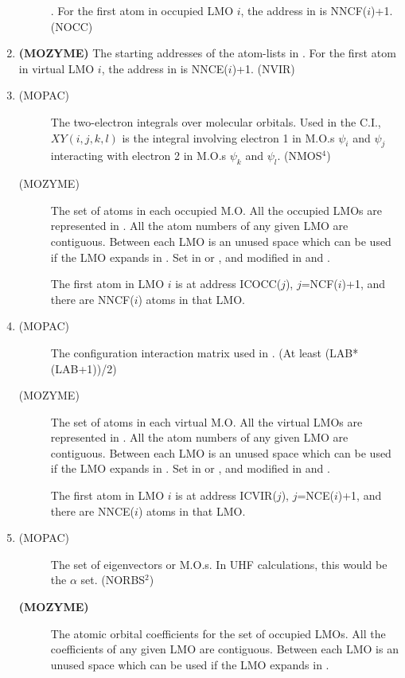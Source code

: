\begin{enumerate}
\begin{description}
.  For the first atom in occupied LMO $i$, the  address in
 is NNCF($i$)+1. (NOCC)
\end{description}
\item {\bf (MOZYME) }  The starting addresses of the atom-lists in
.  For the first atom in virtual LMO $i$, the  address in
 is NNCE($i$)+1. (NVIR)
\item 
\begin{description}
\item[(MOPAC) ] The two-electron integrals over molecular orbitals.
Used in the C.I., $XY(i,j,k,l)$ is the integral involving electron 1 in M.O.s
$\psi_i$ and $\psi_j$ interacting with electron 2 in M.O.s $\psi_k$ and
$\psi_l$. (NMOS$^4$)
\item[(MOZYME) ] The set of atoms in each occupied M.O.  All the
occupied LMOs are represented in . All the atom numbers of any
given LMO are contiguous.  Between each LMO is an unused space which can be
used if the LMO expands in . Set in  or
, and modified in  and .

The first atom in LMO $i$ is at address ICOCC($j$), $j$=NCF($i$)+1, and there
are NNCF($i$) atoms in that LMO.
\end{description}
\item 
\begin{description}
\item[(MOPAC) ] The configuration interaction matrix used 
in . (At least (LAB*(LAB+1))/2)
\item[(MOZYME) ] The set of atoms in each virtual M.O.  All the
virtual  LMOs are represented in . All the atom numbers of any
given LMO are contiguous.  Between each LMO is an unused space which can be
used if the LMO expands in . Set in  or ,
and modified in  and .

The first atom in LMO $i$ is at address ICVIR($j$), $j$=NCE($i$)+1, and there
are NNCE($i$) atoms in that LMO.
\end{description}
\item 
\begin{description}
\item[(MOPAC) ] The set of eigenvectors or M.O.s.  In  UHF
calculations, this would be the $\alpha$ set. (NORBS$^2$)
\item[\bf (MOZYME) ] The atomic orbital coefficients for the  set
of occupied LMOs.  All the coefficients of any given LMO are contiguous. 
Between each LMO is an unused space which can be used if the LMO expands in
.


\end{description}
\end{enumerate}
